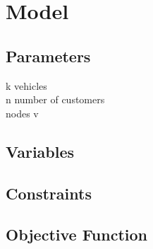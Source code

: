 \chapter{Model}

\section{Parameters}
k vehicles
\\n number of customers
\\nodes v
\section{Variables}

\section{Constraints}

\section{Objective Function}
